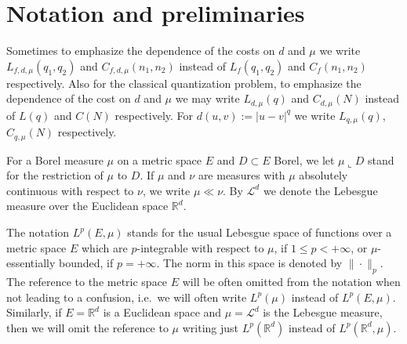 \documentclass{amsart}
\theoremstyle{remark}
\numberwithin{equation}{section}
\numberwithin{figure}{section}
\newcommand{\R}{\mathbb{R}}
\newcommand{\res}{\llcorner}
\begin{document}
\section{Notation and preliminaries}

Sometimes to emphasize the dependence of the costs on $d$ and $\mu$ we write
$L_{f,d,\mu}(q_1, q_2)$ and $C_{f,d,\mu}(n_1, n_2)$ instead of $L_{f}(q_1, q_2)$ and $C_{f}(n_1, n_2)$
respectively.
Also for the classical quantization problem, to emphasize the dependence of the cost on $d$ and $\mu$ we may write
$L_{d,\mu}(q)$ and $C_{d,\mu}(N)$ instead of $L(q)$ and $C(N)$
respectively. For $d(u, v):= |u-v|^q$ we write $L_{q,\mu}(q)$, $C_{q,\mu}(N)$ respectively.


For a Borel measure $\mu$ on a metric space $E$ and $D\subset E$ Borel, we let $\mu\res D $ stand for the restriction of $\mu$ to $D$.
If $\mu$ and $\nu$ are measures with $\mu$ absolutely continuous with respect to $\nu$, we write $\mu\ll\nu$.
By $\mathcal{L}^d$ we denote the Lebesgue measure over the Euclidean space $\R^d$.

The notation $L^p(E,\mu)$ stands for the usual Lebesgue space of functions over a metric space $E$ which are
$p$-integrable with respect to $\mu$, if $1\leq p<+\infty$,  or 
$\mu$-essentially bounded, if $p=+\infty$. The norm in this space is denoted by $\|\cdot\|_p$. 
The reference to the metric space $E$ will be often omitted from the notation when
not leading to a confusion, i.e.\ we will often write $L^p(\mu)$ instead of $L^p(E,\mu)$. Similarly, if $E=\R^d$ is a Euclidean space and 
$\mu=\mathcal{L}^d$ is the Lebesgue measure, then we will omit the reference to $\mu$ writing just $L^p(\R^d)$ instead of $L^p(\R^d,\mu)$.     

\end{document}
